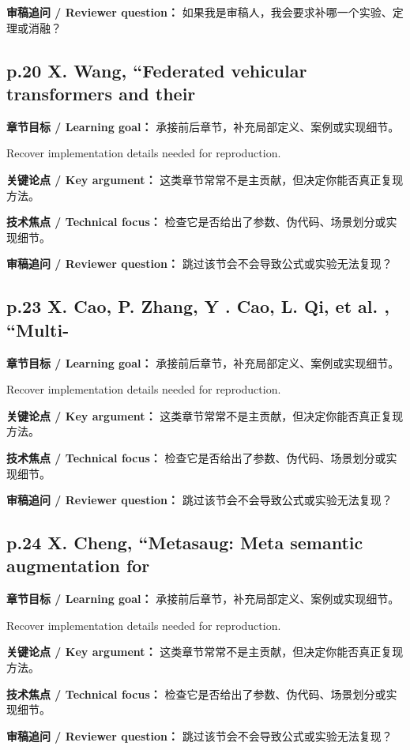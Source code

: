 \documentclass[UTF8,a4paper,11pt,fontset=fandol]{ctexart}
\begin{document}
\textbf{审稿追问 / Reviewer question：} 如果我是审稿人，我会要求补哪一个实验、定理或消融？

\subsection*{p.20 X. Wang, “Federated vehicular transformers and their}
\textbf{章节目标 / Learning goal：} 承接前后章节，补充局部定义、案例或实现细节。

Recover implementation details needed for reproduction.

\textbf{关键论点 / Key argument：} 这类章节常常不是主贡献，但决定你能否真正复现方法。

\textbf{技术焦点 / Technical focus：} 检查它是否给出了参数、伪代码、场景划分或实现细节。

\textbf{审稿追问 / Reviewer question：} 跳过该节会不会导致公式或实验无法复现？

\subsection*{p.23 X. Cao, P. Zhang, Y . Cao, L. Qi, et al. , “Multi-}
\textbf{章节目标 / Learning goal：} 承接前后章节，补充局部定义、案例或实现细节。

Recover implementation details needed for reproduction.

\textbf{关键论点 / Key argument：} 这类章节常常不是主贡献，但决定你能否真正复现方法。

\textbf{技术焦点 / Technical focus：} 检查它是否给出了参数、伪代码、场景划分或实现细节。

\textbf{审稿追问 / Reviewer question：} 跳过该节会不会导致公式或实验无法复现？

\subsection*{p.24 X. Cheng, “Metasaug: Meta semantic augmentation for}
\textbf{章节目标 / Learning goal：} 承接前后章节，补充局部定义、案例或实现细节。

Recover implementation details needed for reproduction.

\textbf{关键论点 / Key argument：} 这类章节常常不是主贡献，但决定你能否真正复现方法。

\textbf{技术焦点 / Technical focus：} 检查它是否给出了参数、伪代码、场景划分或实现细节。

\textbf{审稿追问 / Reviewer question：} 跳过该节会不会导致公式或实验无法复现？
\end{document}
